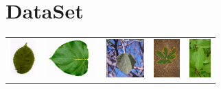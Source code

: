 \documentclass[journal, 10pt]{IEEEtran}
\begin{document}
\section{DataSet}
\label{DataSet}
  \begin{tabular}{c@{}c@{}c@{}c@{}c@{}}
  {\includegraphics[height=4.0em]{swedish1}} &
  {\includegraphics[height=4.0em]{flavia1}} &
  {\includegraphics[height=4.0em]{clef1}} &
  {\includegraphics[height=4.0em]{clef2}} &
  {\includegraphics[height=4.0em]{clef3}}
  \end{tabular}
\end{document}
